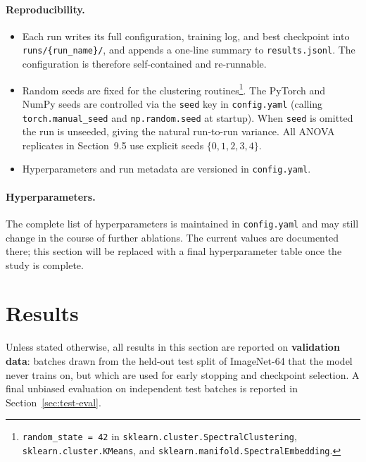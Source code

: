 \documentclass[12pt, a4paper]{article}
\begin{document}
\paragraph{Reproducibility.}
\begin{itemize}
    \item Each run writes its full configuration, training log, and best checkpoint
          into \texttt{runs/\{run\_name\}/}, and appends a one-line summary to
          \texttt{results.jsonl}. The configuration is therefore self-contained and
          re-runnable.
    \item Random seeds are fixed for the clustering routines\footnote{%
          \texttt{random\_state = 42} in
          \texttt{sklearn.cluster.SpectralClustering},
          \texttt{sklearn.cluster.KMeans}, and
          \texttt{sklearn.manifold.SpectralEmbedding}.}.
          The PyTorch and NumPy seeds are controlled via the \texttt{seed} key in
          \texttt{config.yaml} (calling \texttt{torch.manual\_seed} and
          \texttt{np.random.seed} at startup). When \texttt{seed} is omitted the
          run is unseeded, giving the natural run-to-run variance. All ANOVA
          replicates in Section~9.5 use explicit seeds $\{0,1,2,3,4\}$.
    \item Hyperparameters and run metadata are versioned in \texttt{config.yaml}.
\end{itemize}

\paragraph{Hyperparameters.}
The complete list of hyperparameters is maintained in \texttt{config.yaml} and may
still change in the course of further ablations. The current values are documented
there; this section will be replaced with a final hyperparameter table once the
study is complete.

\section{Results}

Unless stated otherwise, all results in this section are reported on
\textbf{validation data}: batches drawn from the held-out test split of
ImageNet-64 that the model never trains on, but which are used for
early stopping and checkpoint selection. A final unbiased evaluation on
independent test batches is reported in Section~\ref{sec:test-eval}.
\end{document}
